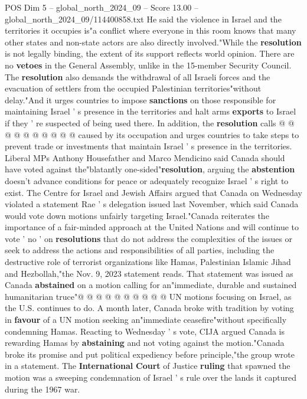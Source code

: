 \begin{textsample}{POS Dim 5 – global\_north\_2024\_09 – Score 13.00 – global\_north\_2024\_09/114400858.txt}
He said the violence in Israel and the territories it occupies is"a conflict where everyone in this room knows that many other states and non-state actors are also directly involved."While the \textbf{resolution} is not legally binding, the extent of its support reflects world opinion.
There are no \textbf{vetoes} in the General Assembly, unlike in the 15-member Security Council.
The \textbf{resolution} also demands the withdrawal of all Israeli forces and the evacuation of settlers from the occupied Palestinian territories"without delay."And it urges countries to impose \textbf{sanctions} on those responsible for maintaining Israel ' s presence in the territories and halt arms \textbf{exports} to Israel if they ' re suspected of being used there.
In addition, the \textbf{resolution} calls @ @ @ @ @ @ @ @ @ @ caused by its occupation and urges countries to take steps to prevent trade or investments that maintain Israel ' s presence in the territories.
Liberal MPs Anthony Housefather and Marco Mendicino said Canada should have voted against the"blatantly one-sided"\textbf{resolution}, arguing the \textbf{abstention} doesn't advance conditions for peace or adequately recognize Israel ' s right to exist.
The Centre for Israel and Jewish Affairs argued that Canada on Wednesday violated a statement Rae ' s delegation issued last November, which said Canada would vote down motions unfairly targeting Israel."Canada reiterates the importance of a fair-minded approach at the United Nations and will continue to vote ' no ' on \textbf{resolutions} that do not address the complexities of the issues or seek to address the actions and responsibilities of all parties, including the destructive role of terrorist organizations like Hamas, Palestinian Islamic Jihad and Hezbollah,"the Nov. 9, 2023 statement reads.
That statement was issued as Canada \textbf{abstained} on a motion calling for an"immediate, durable and sustained humanitarian truce"@ @ @ @ @ @ @ @ @ @ UN motions focusing on Israel, as the U.S. continues to do.
A month later, Canada broke with tradition by voting in \textbf{favour} of a UN motion seeking an"immediate ceasefire"without specifically condemning Hamas.
Reacting to Wednesday ' s vote, CIJA argued Canada is rewarding Hamas by \textbf{abstaining} and not voting against the motion."Canada broke its promise and put political expediency before principle,"the group wrote in a statement.
The \textbf{International} \textbf{Court} of Justice \textbf{ruling} that spawned the motion was a sweeping condemnation of Israel ' s rule over the lands it captured during the 1967 war.

\end{textsample}
